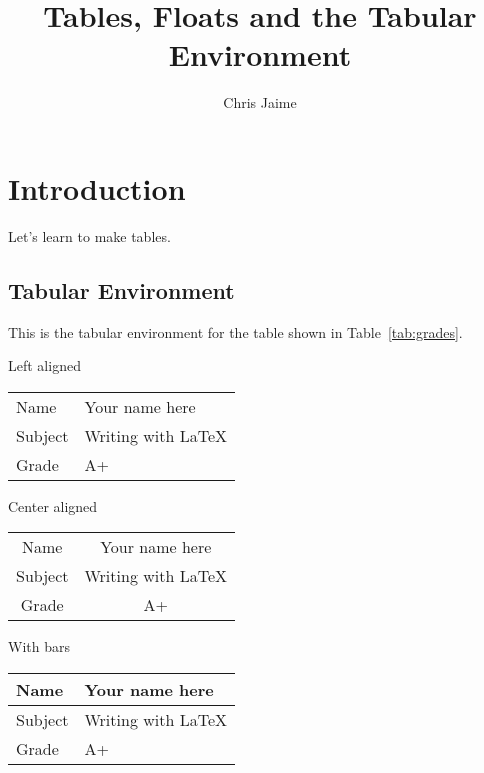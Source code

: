 \documentclass{article}
\title{Tables, Floats and the Tabular Environment}
\author{Chris Jaime}
\date{}
\begin{document}
\maketitle

\section{Introduction}
Let's learn to make tables.

\subsection{Tabular Environment}

This is the tabular environment for the table shown in Table~\ref{tab:grades}.

\vspace{0.5cm} %

\noindent Left aligned
\begin{tabular}{ll} %
Name & Your name here \\
Subject & Writing with \LaTeX \\
Grade & A+ \\
\end{tabular}

\vspace{0.5cm} %

\noindent Center aligned
\begin{tabular}{cc} %
Name & Your name here \\
Subject & Writing with \LaTeX \\
Grade & A+ \\
\end{tabular}

\vspace{0.5cm} %

\noindent With bars
\begin{tabular}{|l|l|} %
\hline
Name & Your name here \\
\hline
Subject & Writing with \LaTeX \\
\hline
Grade & A+ \\
\hline
\end{tabular}
\end{document}
